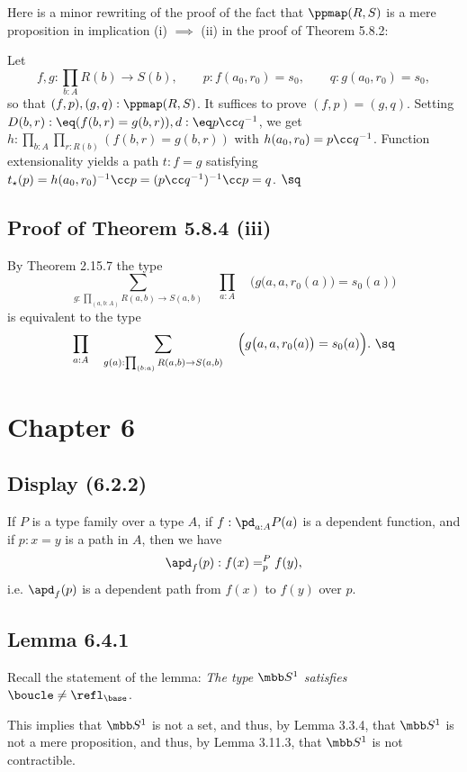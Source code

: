 \documentclass[12pt]{article}
\begin{document}
Here is a minor rewriting of the proof of the fact that $\ppmap(R,S)$ is a mere proposition in implication (i) $\implies$ (ii) in the proof of Theorem 5.8.2: 

Let 
$$
f,g:\prod_{b:A}R(b)\to S(b),\qquad p:f(a_0,r_0)=s_0,\qquad q:g(a_0,r_0)=s_0,
$$ 
so that $(f,p),(g,q):\ppmap(R,S)$. It suffices to prove $(f,p)=(g,q)$. Setting $D(b,r):\eq(f(b,r)=g(b,r)),d:\eq p\cc q^{-1}$, we get $h:\prod_{b:A}\prod_{r:R(b)}(f(b,r)=g(b,r))$ with $h(a_0,r_0)=p\cc q^{-1}$. Function extensionality yields a path $t:f=g$ satisfying $t_\star(p)=h(a_0,r_0)^{-1}\cc p=(p\cc q^{-1})^{-1}\cc p=q$. $\sq$ 


\subsection{Proof of Theorem 5.8.4 (iii)}

By Theorem 2.15.7 the type 
$$
\sum_{g:\prod_{(a,b:A)}R(a,b)\to S(a,b)}\quad\prod_{a:A}\quad\Big(g\big(a,a,r_0(a)\big)=s_0(a)\Big)
$$ 
is equivalent to the type
$$
\prod_{a:A}\quad\sum_{g(a):\prod_{(b:a)}R(a,b)\to S(a,b)}\quad\Big(g\big(a,a,r_0(a)\big)=s_0(a)\Big).\ \sq
$$


\section{Chapter 6}

\subsection{Display (6.2.2)}

If $P$ is a type family over a type $A$, if $f:\pd_{a:A}P(a)$ is a dependent function, and if $p:x=y$ is a path in $A$, then we have 
$$
\apd_f(p):f(x)=^P_pf(y),
$$ 
i.e. $\apd_f(p)$ is a dependent path from $f(x)$ to $f(y)$ over $p$.


\subsection{Lemma 6.4.1}

Recall the statement of the lemma: \emph{The type $\mbb S^1$ satisfies} $\boucle\neq\refl_{\base}$. 

This implies that $\mbb S^1$ is not a set, and thus, by Lemma 3.3.4, that $\mbb S^1$ is not a mere proposition, and thus, by Lemma 3.11.3, that $\mbb S^1$ is not contractible.
\end{document}
